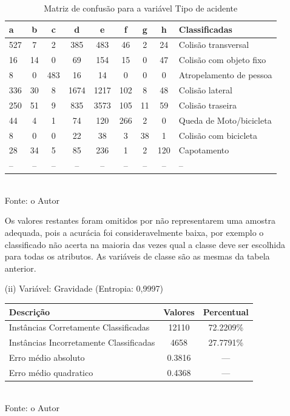\begin{enumerate}
		\begin{table}[!ht]
			\centering
			\caption{Matriz de confusão para a variável Tipo de acidente}
			\vspace{1mm}
			\begin{tabular}{l|c|c|c|c|c|c|c|l}
				\hline
				\textbf{a} & \textbf{b} & \textbf{c} & \textbf{d} & \textbf{e} & \textbf{f} & \textbf{g} & \textbf{h} & \textbf{Classificadas}\\
				\hline
				527 & 7 & 2 & 385 & 483 & 46 & 2 & 24 & Colisão transversal \\
				16 & 14 & 0 & 69 & 154 & 15 & 0 & 47 & Colisão com objeto fixo \\
				8 & 0 & 483 & 16 & 14 & 0 & 0 & 0 & Atropelamento de pessoa \\
				336 & 30 & 8 & 1674 & 1217 & 102 & 8 & 48 & Colisão lateral \\
				250 & 51 & 9 & 835 & 3573 & 105 & 11 & 59 & Colisão traseira \\
				44 & 4 & 1 & 74 & 120 & 266 & 2 & 0 & Queda de Moto/bicicleta \\
				8 & 0 & 0 & 22 & 38 & 3 & 38 & 1 & Colisão com bicicleta \\
				28 & 34 & 5 & 85 & 236 & 1 & 2 & 120 & Capotamento \\
				-- & -- & -- & -- & -- & -- & -- & -- & -- \\	
			\end{tabular}
			\\
			\tiny Fonte: o Autor
		\end{table}
		
		Os valores restantes foram omitidos por não representarem uma amostra
		adequada, pois a acurácia foi consideravelmente baixa, por exemplo o classificado não acerta na maioria das vezes qual a classe deve ser escolhida para todas os atributos. As variáveis de classe são as mesmas da tabela
		anterior. \\
					
	\item[(ii)] Variável: Gravidade (Entropia: 0,9997)
	\begin{table}[!ht]
		\centering
		\vspace{1mm}
		\begin{tabular}{l|c|c}
			\hline
			\textbf{Descrição} & \textbf{Valores} & \textbf{Percentual} \\
			\hline
			Instâncias Corretamente Classificadas & 12110 & 72.2209\% \\
			Instâncias Incorretamente Classificadas & 4658 & 27.7791\% \\
			Erro médio absoluto & 0.3816 & ---  \\
			Erro médio quadratico & 0.4368 & --- \\
		\end{tabular}
		\\
		\tiny Fonte: o Autor
	\end{table}
	

\end{enumerate}
